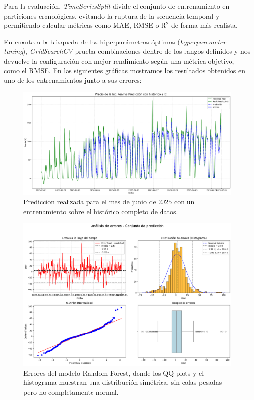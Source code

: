 Para la evaluación, \textit{TimeSeriesSplit} divide el conjunto de entrenamiento en particiones cronológicas, evitando la ruptura de la secuencia temporal y permitiendo calcular métricas como MAE, RMSE o R$^2$ de forma más realista.

En cuanto a la búsqueda de los hiperparámetros óptimos (\textit{hyperparameter tuning}), \textit{GridSearchCV} prueba combinaciones dentro de los rangos definidos y nos devuelve la configuración con mejor rendimiento según una métrica objetivo, como el RMSE. En las siguientes gráficas mostramos los resultados obtenidos en uno de los entrenamientos junto a sus errores:
\begin{figure}[H]
    \centering
    \includegraphics[width=0.7\linewidth]{figuras/RandomForest_prediccion.png}
    \caption[Predicción con Random Forest]{Predicción realizada para el mes de junio de 2025 con un entrenamiento sobre el histórico completo de datos.}
    \label{RandomForest_prediccion}
\end{figure}

\begin{figure}[H]
    \centering
    \includegraphics[width=0.7\linewidth]{figuras/RandomForest_errorespng.png}
    \caption[Errores en predicción con Random Forest]{Errores del modelo Random Forest, donde los QQ-plots y el histograma muestran una distribución simétrica, sin colas pesadas pero no completamente normal.}
    \label{RandomForest_errores}
\end{figure}
%
%
%
